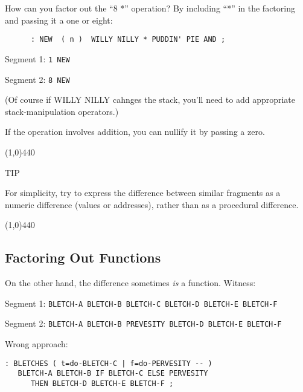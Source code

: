\documentclass{book}
\begin{document}
\bigskip

\noindent
How can you factor out the ``8 *'' operation? By including ``*'' in the factoring and passing it a one or eight:

\begin{verbatim}
      : NEW  ( n )  WILLY NILLY * PUDDIN' PIE AND ;
\end{verbatim}

Segment 1:    \texttt{1 NEW}

Segment 2:    \texttt{8 NEW}

\bigskip

\noindent 
(Of course if WILLY NILLY cahnges the stack, you'll need to add appropriate stack-manipulation operators.)

If the operation involves addition, you can nullify it by passing a zero.

\line(1,0){440} 

\begin{list}{}{}

\item
TIP

\item
For simplicity, try to express the difference between similar fragments as a numeric difference (values or addresses), rather than as a procedural difference.

\end{list}{}{}

\line(1,0){440}

\subsection*{
	\textbf{Factoring Out Functions}}

On the other hand, the difference sometimes \textit{is} a function. Witness:

\bigskip


Segment 1:	\texttt{BLETCH-A BLETCH-B BLETCH-C BLETCH-D BLETCH-E BLETCH-F}

Segment 2:	\texttt{BLETCH-A BLETCH-B PREVESITY BLETCH-D BLETCH-E BLETCH-F}

\bigskip

\noindent
Wrong approach:

\begin{verbatim}
: BLETCHES ( t=do-BLETCH-C | f=do-PERVESITY -- ) 
   BLETCH-A BLETCH-B IF BLETCH-C ELSE PERVESITY 
      THEN BLETCH-D BLETCH-E BLETCH-F ;
\end{verbatim}
\end{document}
